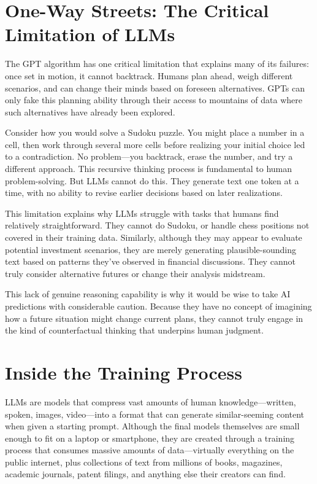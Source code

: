 \documentclass[
  Letterpaper,
]{scrbook}
\begin{document}
\section{One-Way Streets: The Critical Limitation of
LLMs}\label{one-way-streets-the-critical-limitation-of-llms}

The GPT algorithm has one critical limitation that explains many of its
failures: once set in motion, it cannot backtrack. Humans plan ahead,
weigh different scenarios, and can change their minds based on foreseen
alternatives. GPTs can only fake this planning ability through their
access to mountains of data where such alternatives have already been
explored.

Consider how you would solve a Sudoku puzzle. You might place a number
in a cell, then work through several more cells before realizing your
initial choice led to a contradiction. No problem---you backtrack, erase
the number, and try a different approach. This recursive thinking
process is fundamental to human problem-solving. But LLMs cannot do
this. They generate text one token at a time, with no ability to revise
earlier decisions based on later realizations.

This limitation explains why LLMs struggle with tasks that humans find
relatively straightforward. They cannot do Sudoku, or handle chess
positions not covered in their training data. Similarly, although they
may appear to evaluate potential investment scenarios, they are merely
generating plausible-sounding text based on patterns they've observed in
financial discussions. They cannot truly consider alternative futures or
change their analysis midstream.

This lack of genuine reasoning capability is why it would be wise to
take AI predictions with considerable caution. Because they have no
concept of imagining how a future situation might change current plans,
they cannot truly engage in the kind of counterfactual thinking that
underpins human judgment.

\section{Inside the Training Process}\label{inside-the-training-process}

LLMs are models that compress vast amounts of human knowledge---written,
spoken, images, video---into a format that can generate similar-seeming
content when given a starting prompt. Although the final models
themselves are small enough to fit on a laptop or smartphone, they are
created through a training process that consumes massive amounts of
data---virtually everything on the public internet, plus collections of
text from millions of books, magazines, academic journals, patent
filings, and anything else their creators can find.
\end{document}
